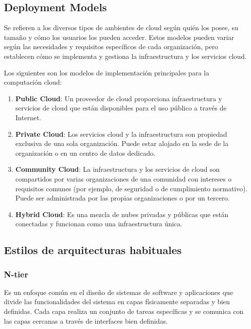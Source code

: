 \documentclass{article}
\begin{document}
		\subsection{Deployment Models}
		Se refieren a los diversos tipos de ambientes de cloud según quién los posee, su tamaño y cómo los usuarios los pueden acceder. Estos modelos pueden variar según las necesidades y requisitos específicos de cada organización, pero establecen cómo se implementa y gestiona la infraestructura y los servicios cloud.
		
		
		Los siguientes son los modelos de implementación principales para la computación cloud:

		\begin{enumerate}
			
			\item {\textbf{Public Cloud}}: Un proveedor de cloud proporciona infraestructura y servicios de cloud que están disponibles para el uso público a través de Internet.

			\item {\textbf{Private Cloud}}: Los servicios cloud y la infraestructura son propiedad exclusiva de una sola organización. Puede estar alojado en la sede de la organización o en un centro de datos dedicado.
			
			
			\item {\textbf{Community Cloud}}: La infraestructura y los servicios de cloud son compartidos por varias organizaciones de una comunidad con intereses o requisitos comunes (por ejemplo, de seguridad o de cumplimiento normativo). Puede ser administrada por las propias organizaciones o por un tercero.
			

				
			\item {\textbf{Hybrid Cloud}}: Es una mezcla de nubes privadas y públicas que están conectadas y funcionan como una infraestructura única.
			
		\end{enumerate}
		
		\subsection{Estilos de arquitecturas habituales}
		
		\subsubsection{N-tier}
		Es un enfoque común en el diseño de sistemas de software y aplicaciones que divide las funcionalidades del sistema en capas físicamente separadas y bien definidas. Cada capa realiza un conjunto de tareas específicas y se comunica con las capas cercanas a través de interfaces bien definidas. 
		
\end{document}
